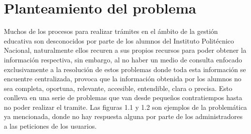 \section{Planteamiento del problema}
    
    Muchos de los procesos para realizar trámites en el ámbito de la gestión educativa son desconocidos por parte de los alumnos del Instituto Politécnico Nacional, naturalmente ellos recuren a sus propios recursos para poder obtener la información respectiva, sin embargo, al no haber un medio de consulta enfocado exclusivamente a la resolución de estos problemas donde toda esta información se encuentre centralizada, provoca que la información obtenida por los alumnos no sea completa, oportuna, relevante, accesible, entendible, clara o precisa. Esto conlleva en una serie de problemas que van desde pequeños contratiempos hasta no poder realizar el tramite. Las figuras 1.1 y 1.2 son ejemplos de la problemática ya mencionada, donde no hay respuesta alguna por parte de los administradores a las peticiones de los usuarios.
    
